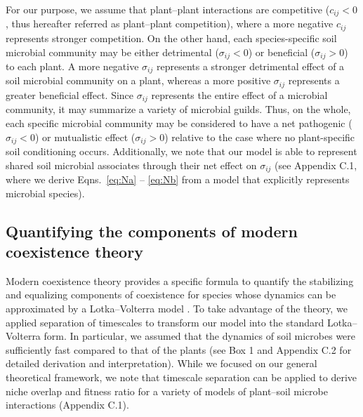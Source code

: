 \noindent For our purpose, we assume that plant--plant interactions are competitive ($c_{ij} < 0$, thus hereafter referred as plant--plant competition), where a more negative $c_{ij}$ represents stronger competition.
On the other hand, each species-specific soil microbial community may be either detrimental ($\sigma_{ij} < 0$) or beneficial ($\sigma_{ij} > 0$) to each plant.
A more negative $\sigma_{ij}$ represents a stronger detrimental effect of a soil microbial community on a plant, whereas a more positive $\sigma_{ij}$ represents a greater beneficial effect.
Since $\sigma_{ij}$ represents the entire effect of a microbial community, it may summarize a variety of microbial guilds. Thus, on the whole, each specific microbial community may be considered to have a net pathogenic ($\sigma_{ij} < 0$) or mutualistic effect ($\sigma_{ij} > 0$) relative to the case where no plant-specific soil conditioning occurs.
Additionally, we note that our model is able to represent shared soil microbial associates through their net effect on $\sigma_{ij}$ (see Appendix C.1, where we derive Eqns.~\ref{eq:Na} -- \ref{eq:Nb} from a model that explicitly represents microbial species).
\par



\subsection{Quantifying the components of modern coexistence theory}
Modern coexistence theory provides a specific formula to quantify the stabilizing and equalizing components of coexistence for species whose dynamics can be approximated by a Lotka--Volterra model \citep{Chesson1990, Chesson2008b, Chesson2013ecosys}. To take advantage of the theory, we applied separation of timescales to transform our model into the standard Lotka--Volterra form. In particular, we assumed that the dynamics of soil microbes were sufficiently fast compared to that of the plants (see Box 1 and Appendix C.2 for detailed derivation and interpretation). While we focused on our general theoretical framework, we note that timescale separation can be applied to derive niche overlap and fitness ratio for a variety of models of plant--soil microbe interactions (Appendix C.1).
\par


